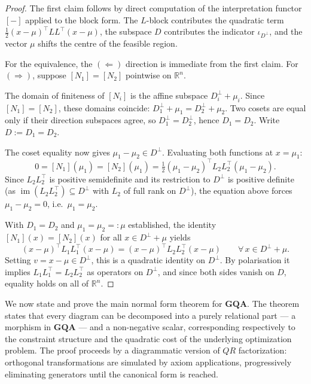 \begin{proof}
The first claim follows by direct computation of the interpretation
functor $[-]$ applied to the block form. The $L$-block contributes
the quadratic term $\tfrac{1}{2}(x-\mu)^\top LL^\top(x-\mu)$, the
subspace $D$ contributes the indicator $\iota_{D^\perp}$, and the
vector $\mu$ shifts the centre of the feasible region.

For the equivalence, the $(\Leftarrow)$ direction is immediate from
the first claim. For $(\Rightarrow)$, suppose $[N_1] = [N_2]$
pointwise on $\mathbb{R}^n$.

The domain of finiteness of $[N_i]$ is the affine subspace
$D_i^\perp + \mu_i$. Since $[N_1] = [N_2]$, these domains coincide:
$D_1^\perp + \mu_1 = D_2^\perp + \mu_2$. Two cosets are equal only
if their direction subspaces agree, so $D_1^\perp = D_2^\perp$,
hence $D_1 = D_2$. Write $D := D_1 = D_2$.

The coset equality now gives $\mu_1 - \mu_2 \in D^\perp$.
Evaluating both functions at $x = \mu_1$:
\[
0 = [N_1](\mu_1) = [N_2](\mu_1)
  = \tfrac{1}{2}(\mu_1 - \mu_2)^\top L_2 L_2^\top (\mu_1 - \mu_2).
\]
Since $L_2 L_2^\top$ is positive semidefinite and its restriction to
$D^\perp$ is positive definite (as $\operatorname{im}(L_2 L_2^\top)
\subseteq D^\perp$ with $L_2$ of full rank on $D^\perp$), the
equation above forces $\mu_1 - \mu_2 = 0$, i.e.\ $\mu_1 = \mu_2$.

With $D_1 = D_2$ and $\mu_1 = \mu_2 =: \mu$ established, the identity
$[N_1](x) = [N_2](x)$ for all $x \in D^\perp + \mu$ yields
\[
(x - \mu)^\top L_1 L_1^\top (x - \mu)
= (x - \mu)^\top L_2 L_2^\top (x - \mu)
\qquad \forall\, x \in D^\perp + \mu.
\]
Setting $v = x - \mu \in D^\perp$, this is a quadratic identity on
$D^\perp$. By polarisation it implies $L_1 L_1^\top = L_2 L_2^\top$
as operators on $D^\perp$, and since both sides vanish on $D$, equality
holds on all of $\mathbb{R}^n$.
\end{proof}

We now state and prove the main normal form theorem for $\mathbf{GQA}$.
The theorem states that every
diagram can be decomposed into a purely relational part — a morphism in
$\mathbf{GQA}$ — and a non-negative scalar, corresponding respectively to
the constraint structure and the quadratic cost of the underlying
optimization problem. The proof proceeds by a diagrammatic version of
$QR$ factorization: orthogonal transformations are simulated by axiom
applications, progressively eliminating generators until the canonical
form is reached.

